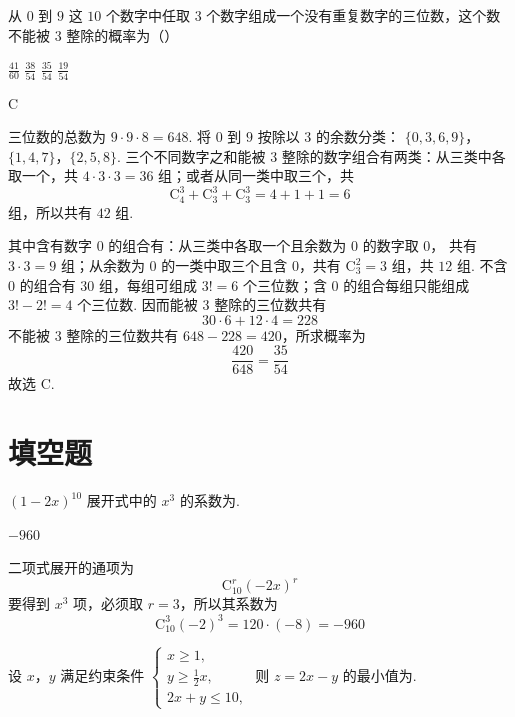 \begin{problem}
从 \(0\) 到 \(9\) 这 \(10\) 个数字中任取 \(3\) 个数字组成一个没有重复数字的三位数，这个数不能被 \(3\) 整除的概率为（\quad）

\choices
    {\(\frac{41}{60}\)}
    {\(\frac{38}{54}\)}
    {\(\frac{35}{54}\)}
    {\(\frac{19}{54}\)}
\end{problem}

\begin{answer}
C
\end{answer}

\begin{solution}
三位数的总数为 \(9\cdot9\cdot8=648\). 将 \(0\) 到 \(9\) 按除以 \(3\) 的余数分类：
\(\{0,3,6,9\}\)，\(\{1,4,7\}\)，\(\{2,5,8\}\).
三个不同数字之和能被 \(3\) 整除的数字组合有两类：从三类中各取一个，共
\(4\cdot3\cdot3=36\) 组；或者从同一类中取三个，共
\[
\mathrm C_4^3+\mathrm C_3^3+\mathrm C_3^3=4+1+1=6
\]
组，所以共有 \(42\) 组.

其中含有数字 \(0\) 的组合有：从三类中各取一个且余数为 \(0\) 的数字取 \(0\)，
共有 \(3\cdot3=9\) 组；从余数为 \(0\) 的一类中取三个且含 \(0\)，共有
\(\mathrm C_3^2=3\) 组，共 \(12\) 组. 不含 \(0\) 的组合有 \(30\) 组，每组可组成
\(3!=6\) 个三位数；含 \(0\) 的组合每组只能组成 \(3!-2!=4\) 个三位数. 因而能被
\(3\) 整除的三位数共有
\[
30\cdot6+12\cdot4=228
\]
不能被 \(3\) 整除的三位数共有 \(648-228=420\)，所求概率为
\[
\frac{420}{648}=\frac{35}{54}
\]
故选 C.
\end{solution}

\section{填空题}
\begin{problem}
\((1 - 2x)^{10}\) 展开式中的 \(x^{3}\) 的系数为\fillinblank{}.
\end{problem}

\begin{answer}
\(-960\)
\end{answer}

\begin{solution}
二项式展开的通项为
\[
\mathrm C_{10}^{r}(-2x)^r
\]
要得到 \(x^3\) 项，必须取 \(r=3\)，所以其系数为
\[
\mathrm C_{10}^{3}(-2)^3=120\cdot(-8)=-960
\]
\end{solution}

\begin{problem}
设 \(x\)，\(y\) 满足约束条件 \(\begin{cases}
x \geqslant 1,\\
y \geqslant \frac{1}{2}x,\\
2x + y \leqslant 10,
\end{cases}\) 则 \(z = 2x - y\) 的最小值为\fillinblank{}.
\end{problem}

